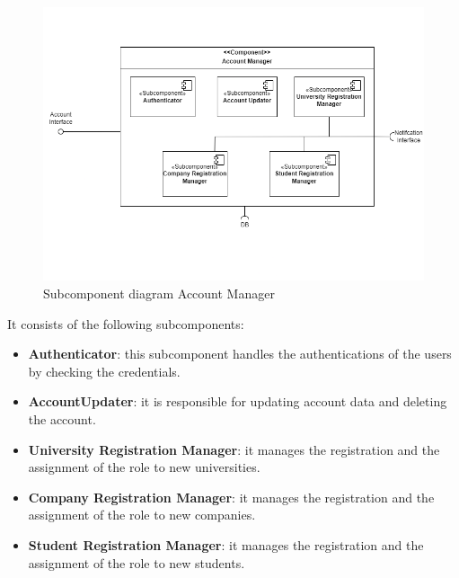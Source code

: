     \begin{figure}[htbp]
    \centering
    \includegraphics[width=\linewidth]{DD/Images/Comp&Sub/Account Manager.png}
    \caption{Subcomponent diagram Account Manager}
    \label{fig:account_manager}
    \end{figure}

   It consists of the following subcomponents:
   \begin{itemize}
    \item  \textbf{Authenticator}: this subcomponent handles the authentications of the users by checking the credentials.
    \item  \textbf{AccountUpdater}: it is responsible for updating account data and deleting the account.
    \item  \textbf{University Registration Manager}: it manages the registration and the assignment of the role to new universities.
    \item  \textbf{Company Registration Manager}: it manages the registration and the assignment of the role to new companies.
    \item  \textbf{Student Registration Manager}: it manages the registration and the assignment of the role to new students.
    \end{itemize}


